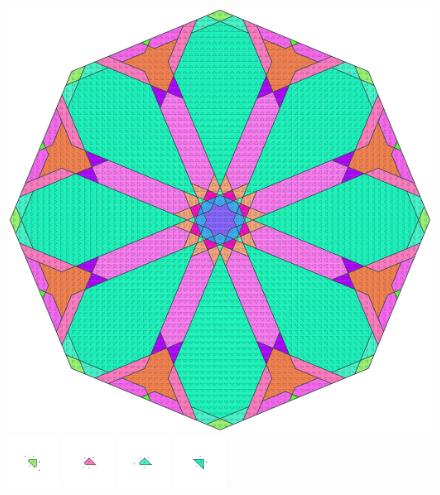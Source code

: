\documentclass[text.tex]{subfiles}
\begin{document}
\clearpage
\pagestyle{fancy}
\fancyhf{}
\begin{figure}[h!]
\centering
\includegraphics[width=1\textwidth]{img/results/octagon/octagon_226776_(-3_5alpha_4).pdf}
\includegraphics[width=0.12\textwidth]{img/results/octagon/octagon_226776_(-3_5alpha_4)_001.pdf}
\includegraphics[width=0.12\textwidth]{img/results/octagon/octagon_226776_(-3_5alpha_4)_002.pdf}
\includegraphics[width=0.12\textwidth]{img/results/octagon/octagon_226776_(-3_5alpha_4)_003.pdf}
\includegraphics[width=0.12\textwidth]{img/results/octagon/octagon_226776_(-3_5alpha_4)_004.pdf}

\end{figure}
\end{document}
